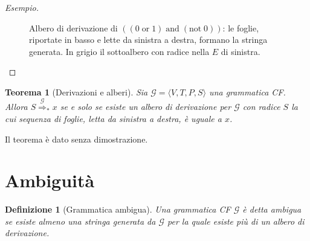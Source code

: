 \documentclass[a4paper, 11pt, oneside]{book}
\theoremstyle{formale}
\newtheorem{theorem}{Teorema}
\newtheorem*{definition}{Definizione}
\newenvironment{esempio}
    {\begin{proof}[\textit{Esempio}]\renewcommand{\qedsymbol}{$\diamond$}}
    {\end{proof}}
\begin{document}
\begin{esempio}
\begin{figure}[H]
            \caption{Albero di derivazione di
                $((0 \;\mathrm{or}\; 1) \;\mathrm{and}\; (\mathrm{not}\; 0))$: le foglie,
                riportate in basso e lette da sinistra a destra, formano la stringa
                generata. In grigio il sottoalbero con radice nella $E$ di sinistra.}
            \label{fig:albero-booleano}
        \end{figure}
    \end{esempio}

    \begin{theorem}[Derivazioni e alberi]
        \label{thm:derivazioni-alberi}
        Sia $\mathcal{G} = \langle V, T, P, S \rangle$ una grammatica CF. Allora
        $S \overset{\mathcal{G}}{\Rightarrow}_* x$ se e solo se esiste un albero di
        derivazione per $\mathcal{G}$ con radice $S$ la cui sequenza di foglie, letta da
        sinistra a destra, \`e uguale a $x$.
    \end{theorem}
    Il teorema \`e dato senza dimostrazione.

    \section{Ambiguit\`a}
    \begin{definition}[Grammatica ambigua]
        Una grammatica CF $\mathcal{G}$ \`e detta \emph{ambigua} se esiste almeno una
        stringa generata da $\mathcal{G}$ per la quale esiste pi\`u di un albero di
        derivazione.
    \end{definition}
\end{document}
